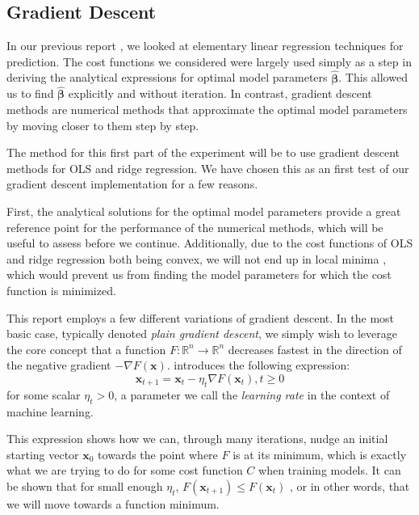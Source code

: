 \subsection{Gradient Descent}
In our previous report \cite{fysstkproject1}, we looked at elementary linear regression techniques for prediction. The cost functions we considered were largely used simply as a step in deriving the analytical expressions for optimal model parameters $\boldsymbol{\hat{\beta}}$.  This allowed us to find $\boldsymbol{\hat{\beta}}$ explicitly and without iteration. In contrast, gradient descent methods are numerical methods that approximate the optimal model parameters by moving closer to them step by step. 

The method for this first part of the experiment will be to use gradient descent methods for OLS and ridge regression. We have chosen this as an first test of our gradient descent implementation for a few reasons. 

First, the analytical solutions for the optimal model parameters provide a great reference point for the performance of the numerical methods, which will be useful to assess before we continue. Additionally, due to the cost functions of OLS and ridge regression both being convex, we will not end up in local minima \cite{MHJoptimization}, which would prevent us from finding the model parameters for which the cost function is minimized. 

This report employs a few different variations of gradient descent. In the most basic case, typically denoted \emph{plain gradient descent}, we simply wish to leverage the core concept that a function $F: \mathbb{R}^n \rightarrow \mathbb{R}^n$ decreases fastest in the direction of the negative gradient $-\nabla F (\boldsymbol x )$. \textcite{MHJweek39} introduces the following expression:
\[\boldsymbol x_{t+1} = \boldsymbol x_t - \eta_t \nabla F (\boldsymbol x_t), t \geq 0\]
for some scalar $\eta_t > 0$, a parameter we call the \emph{learning rate} in the context of machine learning. 

This expression shows how we can, through many iterations, nudge an initial starting vector $\boldsymbol x_0$ towards the point where $F$ is at its minimum, which is exactly what we are trying to do for some cost function $C$ when training models. It can be shown that for small enough $\eta_t$, $F(\boldsymbol x_{t+1}) \leq F(\boldsymbol x_{t})$ \cite{MHJweek39}, or in other words, that we will move towards a function minimum.

